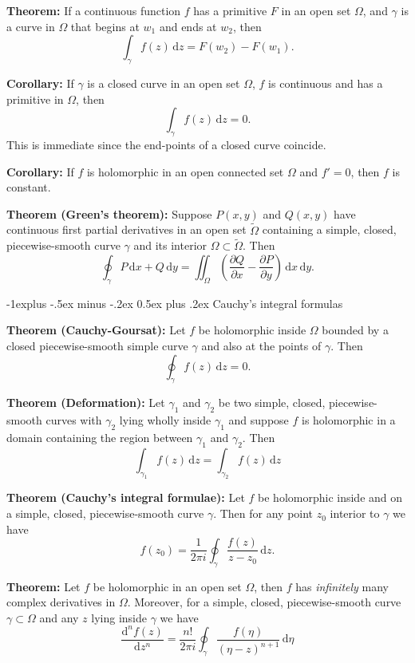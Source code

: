 \documentclass[10pt,landscape]{article}
\makeatletter
\renewcommand{\subsection}{\@startsection{subsection}{2}{0mm}%
                                {-1explus -.5ex minus -.2ex}%
                                {0.5ex plus .2ex}%
                                {\normalfont\normalsize\bfseries}}
\makeatother
\begin{document}
\begin{multicols}{3}
\textbf{Theorem:} If a continuous function $f$ has a primitive $F$ in an open set $\Omega$, and $\gamma$ is a curve in $\Omega$ that begins at $w_1$ and ends at $w_2$, then
$$\int_{\gamma} f(z)\, \text{d}z = F(w_2) - F(w_1).$$

\textbf{Corollary:} If $\gamma$ is a closed curve in an open set $\Omega$, $f$ is continuous and
has a primitive in $\Omega$, then $$\int_{\gamma} f(z)\, \text{d}z = 0.$$
This is immediate since the end-points of a closed curve coincide.

\textbf{Corollary:} If $f$ is holomorphic in an open connected set $\Omega$ and $f' = 0$,
then $f$ is constant.

\textbf{Theorem (Green's theorem):} Suppose $P(x, y)$ and $Q(x, y)$ have continuous
first partial derivatives in an open set $\widetilde{\Omega}$ containing a simple, closed,
piecewise-smooth curve $\gamma$ and its interior $\Omega \subset \widetilde{\Omega}.$ Then $$\oint_{\gamma} P \, \text{d}x + Q \, \text{d} y = \iint_{\Omega} \left(\frac{\partial Q}{\partial x} - \frac{\partial P}{\partial y}\right) \, \text{d}x\, \text{d}y.$$


\subsection{Cauchy's integral formulas}

\textbf{Theorem (Cauchy-Goursat):}
Let $f$ be holomorphic inside $\Omega$
bounded by a closed piecewise-smooth simple curve $\gamma$ and also at the points
of $\gamma$. Then
$$\oint_{\gamma} f(z) \, \text{d}z = 0.$$

\textbf{Theorem (Deformation):}
Let $\gamma_1$ and $\gamma_2$ be two simple, closed,
piecewise-smooth curves with $\gamma_2$ lying wholly inside $\gamma_1$ and suppose $f$ is
holomorphic in a domain containing the region between $\gamma_1$ and $\gamma_2$. Then
$$\int_{\gamma_1} f(z) \, \text{d}z = \int_{\gamma_2} f(z) \, \text{d}z  $$

\textbf{Theorem (Cauchy’s integral formulae):}
Let $f$ be holomorphic inside and on a simple, closed,
piecewise-smooth curve $\gamma$. Then for any point $z_0$ interior to $\gamma$ we have
$$f(z_0) = \frac{1}{2 \pi i} \oint_{\gamma} \frac{f(z)}{z - z_0} \, \text{d}z.$$

\textbf{Theorem:} Let $f$ be holomorphic in an open set $\Omega$, then $f$ has \textit{infinitely}
many complex derivatives in $\Omega$. Moreover, for a simple, closed, piecewise-smooth
curve $\gamma \subset \Omega$ and any $z$ lying inside $\gamma$ we have
$$\frac{\text{d}^n f(z)}{\text{d}z^n} = \frac{n!}{2 \pi i} \oint_{\gamma} \frac{f(\eta)}{(\eta - z)^{n+1}} \, \text{d}\eta$$


\end{multicols}
\end{document}
